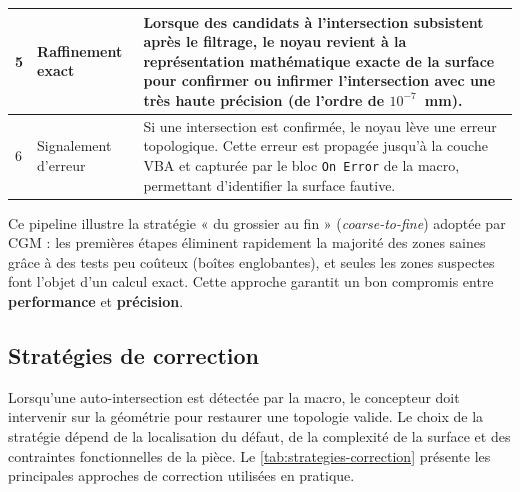 \begin{table}[H]
\begin{tabularx}{\textwidth}{|>{\centering\arraybackslash}p{0.8cm}|>{\bfseries\raggedright\arraybackslash}p{3.2cm}|X|}
        \hline
        \rowcolor{rowlight}
        5 & Raffinement exact & Lorsque des candidats à l'intersection subsistent après le filtrage, le noyau revient à la représentation mathématique exacte de la surface pour confirmer ou infirmer l'intersection avec une très haute précision (de l'ordre de $10^{-7}$~mm). \\
        \hline
        \rowcolor{rowwhite}
        6 & Signalement d'erreur & Si une intersection est confirmée, le noyau lève une erreur topologique. Cette erreur est propagée jusqu'à la couche VBA et capturée par le bloc \texttt{On Error} de la macro, permettant d'identifier la surface fautive. \\
        \hline
    \end{tabularx}
\end{table}

Ce pipeline illustre la stratégie « du grossier au fin » (\textit{coarse-to-fine}) adoptée par CGM : les premières étapes éliminent rapidement la majorité des zones saines grâce à des tests peu coûteux (boîtes englobantes), et seules les zones suspectes font l'objet d'un calcul exact. Cette approche garantit un bon compromis entre \textbf{performance} et \textbf{précision}.

\subsection{Stratégies de correction}

Lorsqu'une auto-intersection est détectée par la macro, le concepteur doit intervenir sur la géométrie pour restaurer une topologie valide. Le choix de la stratégie dépend de la localisation du défaut, de la complexité de la surface et des contraintes fonctionnelles de la pièce. Le \autoref{tab:strategies-correction} présente les principales approches de correction utilisées en pratique.

